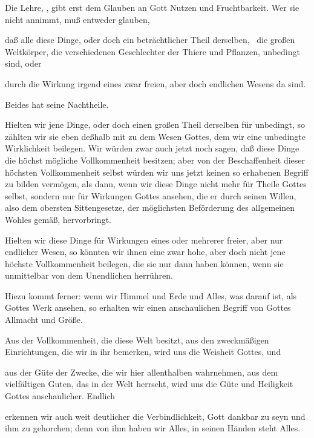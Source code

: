 \begin{aufza}
\item Die Lehre, , gibt erst dem Glauben an Gott Nutzen und Fruchtbarkeit. Wer sie nicht annimmt, muß entweder glauben,
\begin{aufzb}
\item daß alle diese Dinge, oder doch ein beträchtlicher Theil derselben, \zB\ die großen Weltkörper, die verschiedenen Geschlechter der Thiere und Pflanzen, unbedingt sind, oder
\item durch die Wirkung irgend eines zwar freien, aber doch endlichen Wesens da sind.
\end{aufzb}
Beides hat seine Nachtheile.
\begin{aufzb}
\item Hielten wir jene Dinge, oder doch einen großen Theil derselben für unbedingt, so zählten wir sie eben deßhalb mit zu dem Wesen Gottes, dem wir eine unbedingte Wirklichkeit beilegen. Wir würden zwar auch jetzt noch sagen, daß diese Dinge die höchst mögliche Vollkommenheit besitzen; aber von der Beschaffenheit dieser höchsten Vollkommenheit selbst würden wir uns jetzt keinen so erhabenen Begriff zu bilden vermögen, als dann, wenn wir diese Dinge nicht mehr für Theile Gottes selbst, sondern nur für Wirkungen Gottes ansehen, die er durch seinen Willen, also dem obersten Sittengesetze, der möglichsten Beförderung des allgemeinen Wohles gemäß, hervorbringt.~
\item Hielten wir diese Dinge für Wirkungen eines oder mehrerer freier, aber nur endlicher Wesen, so könnten wir ihnen eine zwar hohe, aber doch nicht jene höchste Vollkommenheit beilegen, die sie nur dann haben können, wenn sie unmittelbar von dem Unendlichen herrühren.
\item Hiezu kommt ferner: wenn wir Himmel und Erde und Alles, was darauf ist, als Gottes Werk ansehen, so erhalten wir einen anschaulichen Begriff von Gottes Allmacht und Größe.
\item Aus der Vollkommenheit, die diese Welt besitzt, aus den zweckmäßigen Einrichtungen, die wir in ihr bemerken, wird uns die Weisheit Gottes, und
\item aus der Güte der Zwecke, die wir hier allenthalben wahrnehmen, aus dem vielfältigen Guten, das in der Welt herrscht, wird uns die Güte und Heiligkeit Gottes anschaulicher. Endlich
\item erkennen wir auch weit deutlicher die Verbindlichkeit, Gott dankbar zu seyn und ihm zu gehorchen; denn von ihm haben wir Alles, in seinen Händen steht Alles.

\end{aufzb}
\end{aufza}

